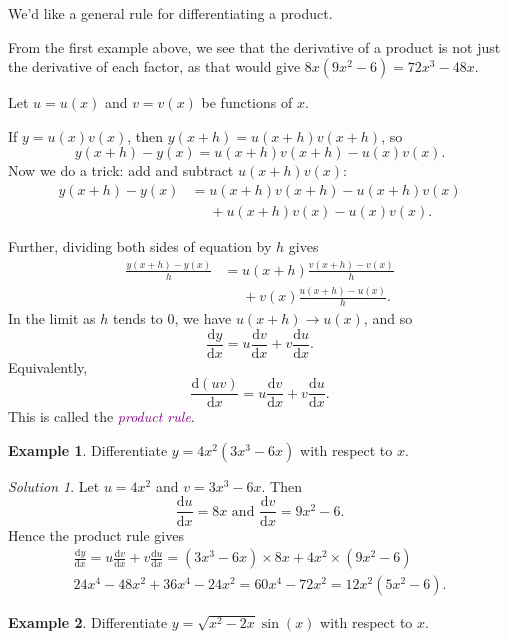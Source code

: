 \documentclass[
  english,
  11pt,
  oneside]{book}
\newcommand{\slide}{}
\theoremstyle{definition}
\theoremstyle{definition}
\newtheorem{example}{Example}[chapter]
\theoremstyle{definition}
\theoremstyle{definition}
\theoremstyle{remark}
\newtheorem*{solution}{Solution}
\begin{document}
We'd like a general rule for differentiating a product.

From the first example above, we see that the derivative of a product is not just the derivative of each factor, as
that would give \(8x(9x^2 - 6) = 72x^3 - 48x\).

Let \(u = u(x)\) and \(v = v(x)\) be functions of \(x\).

If \(y = u(x)v(x)\), then \(y(x+h) = u(x+h)v(x+h)\), so
\[y(x+h)-y(x) = u(x+h)v(x+h) - u(x)v(x).\]
Now we do a trick: add and subtract \(u(x+h)v(x)\):
\begin{align*}
y(x+h)-y(x) &= u(x+h)v(x+h) - u(x+h)v(x)\\
    &\phantom{=} + u(x+h)v(x) - u(x)v(x).
\end{align*}
\slide
Further, dividing both sides of equation by \(h\) gives
\begin{align*}
\frac{y(x+h)-y(x)}{h} &= u(x+h)\frac{v(x+h) - v(x)}{h} \\
 &\phantom{=} + v(x)\frac{u(x+h ) - u(x)}{h}.
\end{align*}
In the limit as \(h\) tends to \(0\), we have \(u(x+h)\to u(x)\), and so
\[ 
\frac{\mathrm{d} y}{\mathrm{d} x} = u\frac{\mathrm{d} v}{\mathrm{d} x} + v\frac{\mathrm{d} u}{\mathrm{d} x}.
\]
Equivalently,
\[ 
\frac{\mathrm{d}(uv)}{\mathrm{d} x} = u\frac{\mathrm{d} v}{\mathrm{d} x} + v\frac{\mathrm{d} u}{\mathrm{d} x}.
\]
This is called the \textcolor{purple}{\em product rule}.
\slide

\begin{example}
Differentiate \(y=4x^2(3x^3-6x)\) with respect to \(x\).
\end{example}

\begin{solution}
Let \(u = 4x^2\) and \(v = 3x^3-6x\). Then
\[
\frac{\mathrm{d} u}{\mathrm{d} x} = 8x\text{ and }\frac{\mathrm{d} v}{\mathrm{d} x} = 9x^2-6.
\]
Hence the product rule gives
\begin{gather*}
\frac{\mathrm{d} y}{\mathrm{d} x} = u\frac{\mathrm{d} v}{\mathrm{d} x} + v\frac{\mathrm{d} u}{\mathrm{d} x} = (3x^3-6x)\times 8x + 4x^2\times(9x^2-6)\\
24x^4 - 48x^2 + 36x^4-24x^2 = 60x^4-72x^2 = 12x^2(5x^2-6).
\end{gather*}
\end{solution}

\slide

\begin{example}
Differentiate \(y=\sqrt{x^2-2x}\sin(x)\) with respect to \(x\).
\end{example}
\end{document}
